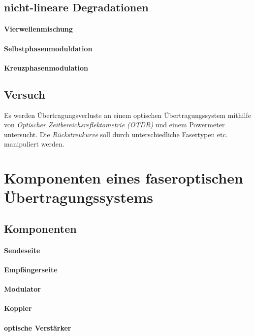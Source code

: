 \documentclass[a4paper]{article}
\begin{document}
\subsection{nicht-lineare Degradationen}
\paragraph{Vierwellenmischung}
\paragraph{Selbstphasenmoduldation}
\paragraph{Kreuzphasenmodulation}

\subsection{Versuch}
Es werden Übertragungsverluste an einem optischen Übertragungssystem
mithilfe von \emph{Optischer Zeitbereichsreflektometrie (OTDR)} und
einem Powermeter untersucht.
Die \emph{Rückstreukurve} soll durch unterschiedliche Fasertypen etc.
manipuliert werden.


\newpage
\section{Komponenten eines faseroptischen Übertragungssystems}
\subsection{Komponenten}
\paragraph{Sendeseite}
\paragraph{Empfängerseite}
\paragraph{Modulator}
\paragraph{Koppler}
\paragraph{optische Verstärker}
\end{document}

